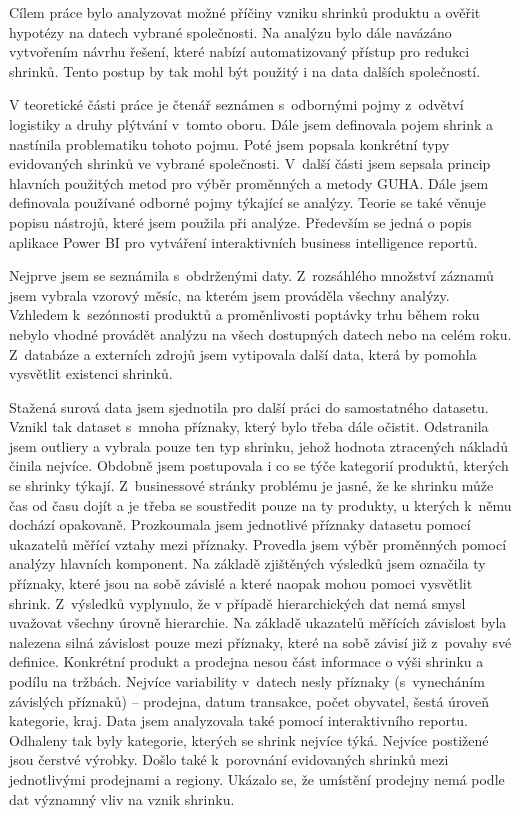 Cílem práce bylo analyzovat možné příčiny vzniku shrinků produktu a ověřit hypotézy na datech vybrané společnosti. Na analýzu bylo dále navázáno vytvořením návrhu řešení, které nabízí automatizovaný přístup pro redukci shrinků. Tento postup by tak mohl být použitý i na data dalších společností.

V teoretické části práce je čtenář seznámen s~odbornými pojmy z~odvětví logistiky a druhy plýtvání v~tomto oboru. Dále jsem definovala pojem shrink a nastínila problematiku tohoto pojmu. Poté jsem popsala konkrétní typy evidovaných shrinků ve vybrané společnosti. V~další části jsem sepsala princip hlavních použitých metod pro výběr proměnných a metody GUHA. Dále jsem definovala používané odborné pojmy týkající se analýzy. Teorie se také věnuje popisu nástrojů, které jsem použila při analýze. Především se jedná o popis aplikace Power BI pro vytváření interaktivních business intelligence reportů.

Nejprve jsem se seznámila s~obdrženými daty. Z~rozsáhlého množství záznamů jsem vybrala vzorový měsíc, na kterém jsem prováděla všechny analýzy. Vzhledem k~sezónnosti produktů a proměnlivosti poptávky trhu během roku nebylo vhodné provádět analýzu na všech dostupných datech nebo na celém roku. Z~databáze a externích zdrojů jsem vytipovala další data, která by pomohla vysvětlit existenci shrinků.

Stažená surová data jsem sjednotila pro další práci do samostatného datasetu. Vznikl tak dataset s~mnoha příznaky, který bylo třeba dále očistit. Odstranila jsem outliery a vybrala pouze ten typ shrinku, jehož hodnota ztracených nákladů činila nejvíce. Obdobně jsem postupovala i co se týče kategorií produktů, kterých se shrinky týkají. Z~businessové stránky problému je jasné, že ke shrinku může čas od času dojít a je třeba se soustředit pouze na ty produkty, u kterých k~němu dochází opakovaně. 
Prozkoumala jsem jednotlivé příznaky datasetu pomocí ukazatelů měřící vztahy mezi příznaky. Provedla jsem výběr proměnných pomocí analýzy hlavních komponent. Na základě zjištěných výsledků jsem označila ty příznaky, které jsou na sobě závislé a které naopak mohou pomoci vysvětlit shrink. Z~výsledků vyplynulo, že v případě hierarchických dat nemá smysl uvažovat všechny úrovně hierarchie. Na základě ukazatelů měřících závislost byla nalezena silná závislost pouze mezi příznaky, které na sobě závisí již z~povahy své definice. Konkrétní produkt a prodejna nesou část informace o výši shrinku a podílu na tržbách. Nejvíce variability v~datech nesly příznaky (s~vynecháním závislých příznaků) -- prodejna, datum transakce, počet obyvatel, šestá úroveň kategorie, kraj.
\newpage
Data jsem analyzovala také pomocí interaktivního reportu. Odhaleny tak byly kategorie, kterých se shrink nejvíce týká. Nejvíce postižené jsou čerstvé výrobky. Došlo také k~porovnání evidovaných shrinků mezi jednotlivými prodejnami a regiony. Ukázalo se, že umístění prodejny nemá podle dat významný vliv na vznik shrinku. 

